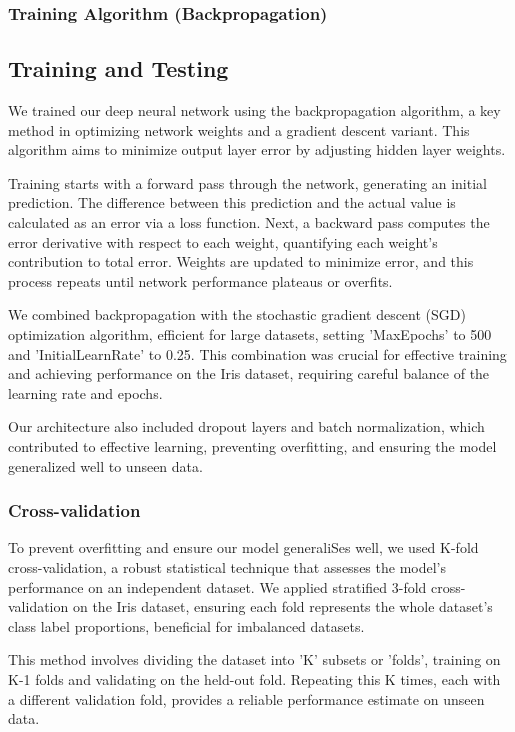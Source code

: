 \documentclass[conference]{inc/IEEEtran}
\begin{document}
\subsubsection{Training Algorithm (Backpropagation)}

\subsection{Training and Testing}

We trained our deep neural network using the backpropagation algorithm, a key method in optimizing network weights and a gradient descent variant. This algorithm aims to minimize output layer error by adjusting hidden layer weights.

Training starts with a forward pass through the network, generating an initial prediction. The difference between this prediction and the actual value is calculated as an error via a loss function. Next, a backward pass computes the error derivative with respect to each weight, quantifying each weight's contribution to total error. Weights are updated to minimize error, and this process repeats until network performance plateaus or overfits.

We combined backpropagation with the stochastic gradient descent (SGD) optimization algorithm, efficient for large datasets, setting 'MaxEpochs' to 500 and 'InitialLearnRate' to 0.25. This combination was crucial for effective training and achieving performance on the Iris dataset, requiring careful balance of the learning rate and epochs.

Our architecture also included dropout layers and batch normalization, which contributed to effective learning, preventing overfitting, and ensuring the model generalized well to unseen data.

\subsubsection{Cross-validation}

To prevent overfitting and ensure our model generaliSes well, we used K-fold cross-validation, a robust statistical technique that assesses the model's performance on an independent dataset. We applied stratified 3-fold cross-validation on the Iris dataset, ensuring each fold represents the whole dataset's class label proportions, beneficial for imbalanced datasets.

This method involves dividing the dataset into 'K' subsets or 'folds', training on K-1 folds and validating on the held-out fold. Repeating this K times, each with a different validation fold, provides a reliable performance estimate on unseen data.
\end{document}
